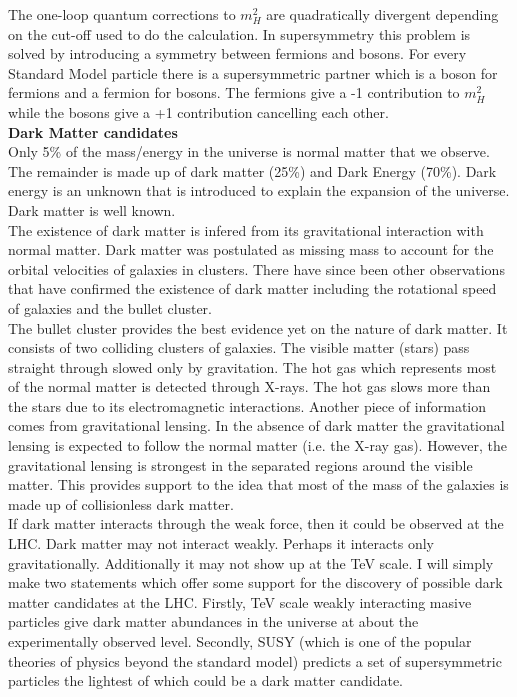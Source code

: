 The one-loop quantum corrections to $m_{H}^{2}$ are quadratically divergent
depending on the cut-off used to do the calculation. In supersymmetry this
problem is solved by introducing a symmetry between fermions and bosons. For 
every Standard Model particle there is a supersymmetric partner which is a boson 
for fermions and a fermion for bosons. The fermions give a -1 contribution to 
$m_{H}^{2}$ while the bosons give a +1 contribution cancelling each other. \\

{\bf Dark Matter candidates} \\

Only 5\% of the mass/energy in the universe is normal matter that we observe. 
The remainder is made up of dark matter (25\%) and Dark Energy (70\%). Dark
energy is an unknown that is introduced to explain the expansion of the
universe. Dark matter is well known. \\

The existence of dark matter is infered from its gravitational interaction with
normal matter. Dark matter was postulated as missing mass to account for the 
orbital velocities of galaxies in clusters. There have since been other 
observations that have confirmed the existence of dark matter including the 
rotational speed of galaxies and the bullet cluster. \\

The bullet cluster provides the best evidence yet on the nature of dark matter. 
It consists of two colliding clusters of galaxies. The visible matter (stars) 
pass straight through slowed only by gravitation. The hot gas which represents 
most of the normal matter is detected through X-rays. The hot gas slows more 
than the stars due to its electromagnetic interactions. Another piece of
information comes from gravitational lensing. In the absence of dark matter the
gravitational lensing is expected to follow the normal matter (i.e. the X-ray 
gas). However, the gravitational lensing is strongest in the separated regions
around the visible matter. This provides support to the idea that most of the 
mass of the galaxies is made up of collisionless dark matter. \\

If dark matter interacts through the weak force, then it could be observed at
the LHC. Dark matter may not interact weakly. Perhaps it interacts only 
gravitationally. Additionally it may not show up at the TeV scale. I will simply
make two statements which offer some support for the discovery of possible dark 
matter candidates at the LHC. Firstly, TeV scale weakly interacting masive 
particles give dark matter abundances in the universe at about the 
experimentally observed level. Secondly, SUSY (which is one of the popular 
theories of physics beyond the standard model) predicts a set of supersymmetric 
particles the lightest of which could be a dark matter candidate.


